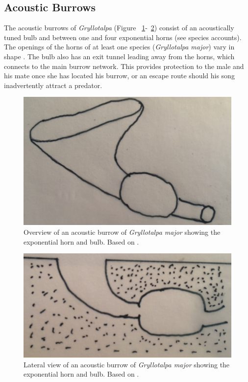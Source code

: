 \documentclass{article}
\begin{document}
   \subsection{Acoustic Burrows}
   The acoustic burrows of \textit{Gryllotalpa} (Figure ~\ref{fig:acoustic_overview}-~\ref{fig:acoustic_overview_lateral}) consist of an acoustically tuned bulb and between one and four exponential horns (see species accounts). The openings of the horns of at least one species (\textit{Gryllotalpa major}) vary in shape \cite{hill2006}. The bulb also has an exit tunnel leading away from the horns, which connects to the main burrow network. This provides protection to the male and his mate once she has located his burrow, or an escape route should his song inadvertently attract a predator.
   \begin{figure}[h]
   	\includegraphics[width=\textwidth]{acoustic_overview}
   	\caption{Overview of an acoustic burrow of \textit{Gryllotalpa major} showing the exponential horn and bulb. Based on \cite{walker1990}.}
   	\label{fig:acoustic_overview}
   \end{figure}
   \begin{figure}[h]
   	\includegraphics[width=\textwidth]{acoustic_overview_lateral}
   	\caption{Lateral view of an acoustic burrow of \textit{Gryllotalpa major} showing the exponential horn and bulb. Based on \cite{walker1990}.}
   	\label{fig:acoustic_overview_lateral}
   \end{figure}
   
\end{document}
